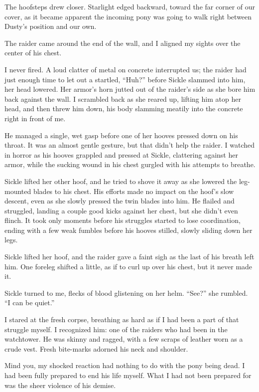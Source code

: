 The hoofsteps drew closer. Starlight edged backward, toward the far corner of our cover, as it became apparent the incoming pony was going to walk right between Dusty’s position and our own.

The raider came around the end of the wall, and I aligned my sights over the center of his chest.

I never fired. A loud clatter of metal on concrete interrupted us; the raider had just enough time to let out a startled, “Huh?” before Sickle slammed into him, her head lowered. Her armor’s horn jutted out of the raider’s side as she bore him back against the wall. I scrambled back as she reared up, lifting him atop her head, and then threw him down, his body slamming meatily into the concrete right in front of me.

He managed a single, wet gasp before one of her hooves pressed down on his throat. It was an almost gentle gesture, but that didn’t help the raider. I watched in horror as his hooves grappled and pressed at Sickle, clattering against her armor, while the sucking wound in his chest gurgled with his attempts to breathe.

Sickle lifted her other hoof, and he tried to shove it away as she lowered the leg-mounted blades to his chest. His efforts made no impact on the hoof’s slow descent, even as she slowly pressed the twin blades into him. He flailed and struggled, landing a couple good kicks against her chest, but she didn’t even flinch. It took only moments before his struggles started to lose coordination, ending with a few weak fumbles before his hooves stilled, slowly sliding down her legs.

Sickle lifted her hoof, and the raider gave a faint sigh as the last of his breath left him. One foreleg shifted a little, as if to curl up over his chest, but it never made it.

Sickle turned to me, flecks of blood glistening on her helm. “See?” she rumbled. “I can be quiet.”

I stared at the fresh corpse, breathing as hard as if I had been a part of that struggle myself. I recognized him: one of the raiders who had been in the watchtower. He was skinny and ragged, with a few scraps of leather worn as a crude vest. Fresh bite-marks adorned his neck and shoulder.

Mind you, my shocked reaction had nothing to do with the pony being dead. I had been fully prepared to end his life myself. What I had not been prepared for was the sheer violence of his demise.

